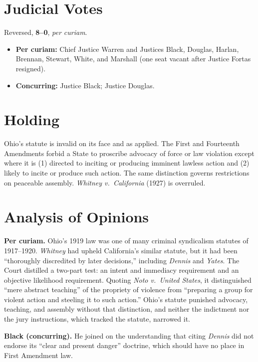 \documentclass[12pt]{article}
\begin{document}
\section{Judicial Votes}

Reversed, \textbf{8--0}, \emph{per curiam}.
\begin{itemize}
\item \textbf{Per curiam:} Chief Justice Warren and Justices Black, Douglas, Harlan, Brennan, Stewart, White, and Marshall (one seat vacant after Justice Fortas resigned).
\item \textbf{Concurring:} Justice Black; Justice Douglas.
\end{itemize}

\section{Holding}

Ohio's statute is invalid on its face and as applied. The First and Fourteenth Amendments forbid a State to proscribe advocacy of force or law violation except where it is (1) directed to inciting or producing imminent lawless action and (2) likely to incite or produce such action. The same distinction governs restrictions on peaceable assembly. \textit{Whitney v.\ California} (1927) is overruled.

\section{Analysis of Opinions}

\textbf{Per curiam.} Ohio's 1919 law was one of many criminal syndicalism statutes of 1917--1920. \textit{Whitney} had upheld California's similar statute, but it had been ``thoroughly discredited by later decisions,'' including \textit{Dennis} and \textit{Yates}. The Court distilled a two-part test: an intent and immediacy requirement and an objective likelihood requirement. Quoting \textit{Noto v.\ United States}, it distinguished ``mere abstract teaching'' of the propriety of violence from ``preparing a group for violent action and steeling it to such action.'' Ohio's statute punished advocacy, teaching, and assembly without that distinction, and neither the indictment nor the jury instructions, which tracked the statute, narrowed it.

\textbf{Black (concurring).} He joined on the understanding that citing \textit{Dennis} did not endorse its ``clear and present danger'' doctrine, which should have no place in First Amendment law.
\end{document}
